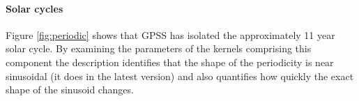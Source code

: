 \documentclass{article}
\begin{document}



\paragraph{Solar cycles}

Figure \ref{fig:periodic} shows that GPSS has isolated the approximately 11 year solar cycle.
By examining the parameters of the kernels comprising this component the description identifies that the shape of the periodicity is near sinusoidal (it does in the latest version) and also quantifies how quickly the exact shape of the sinusoid changes.

%

\end{document}
